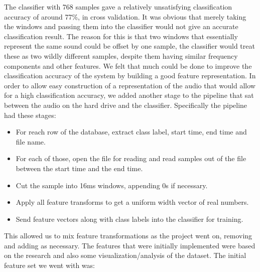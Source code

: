 \documentclass[ %
                    author={Sam Phippen},
                supervisor={Dr. Rafal Bogacz},
                     title={Real time voice activity detectors in noisy personal computing environments},
                  subtitle={},
                    degree={MEng},
                      year={2012} ]{thesis}
\begin{document}
The classifier with 768 samples gave a relatively unsatisfying classification
accuracy of around 77\%, in cross validation. It was obvious that merely taking
the windows and passing them into the classifier would not give an accurate
classification result. The reason for this is that two windows that essentially
represent the same sound could be offset by one sample, the classifier would
treat these as two wildly different samples, despite them having similar
frequency components and other features. We felt that much could be done to
improve the classification accuracy of the system by building a good feature
representation. In order to allow easy construction of a representation of the
audio that would allow for a high classification accuracy, we added another
stage to the pipeline that sat between the audio on the hard drive and the
classifier. Specifically the pipeline had these stages:

\begin{itemize}

    \item For reach row of the database, extract class label, start time, end
        time and file name.

    \item For each of those, open the file for reading and read samples out of
        the file between the start time and the end time.

    \item Cut the sample into 16ms windows, appending 0s if necessary.

    \item Apply all feature transforms to get a uniform width vector of real
        numbers.

    \item Send feature vectors along with class labels into the classifier for
        training.

\end{itemize}

This allowed us to mix feature transformations as the project went on, removing
and adding as necessary. The features that were initially implemented were
based on the research and also some visualization/analysis of the dataset. The
initial feature set we went with was:
\end{document}
